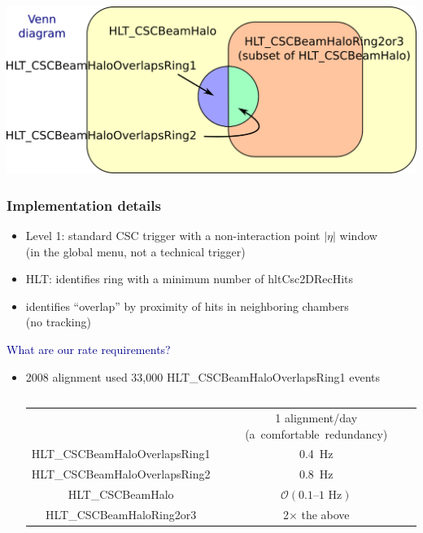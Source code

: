 \documentclass[compress]{beamer}
\begin{document}
\begin{frame}
\begin{center}
\includegraphics[width=0.85\linewidth]{venn_diagram.png}
\end{center}
\end{frame}

\begin{frame}
\frametitle{Implementation details}

\begin{itemize}
\item Level 1: standard CSC trigger with a non-interaction point $|\eta|$ \mbox{window\hspace{-1 cm}} \\ (in the global menu, not a technical trigger)

\item HLT: identifies ring with a minimum number of hltCsc2DRecHits

\item identifies ``overlap'' by proximity of hits in neighboring chambers \\ (no tracking)
\end{itemize}

\vfill
\hspace{-0.83 cm} \textcolor{darkblue}{\Large What are our rate requirements?}

\begin{itemize}
\item 2008 alignment used 33,000 {\scriptsize HLT\_CSCBeamHaloOverlapsRing1} events

\vspace{0.1 cm}
\begin{columns}

\renewcommand{\arraystretch}{1.2} \begin{tabular}{c c}
& 1 alignment/day \mbox{\scriptsize (a comfortable redundancy)\hspace{-3.5 cm}} \\
{\scriptsize HLT\_CSCBeamHaloOverlapsRing1} & 0.4~Hz \\
{\scriptsize HLT\_CSCBeamHaloOverlapsRing2} & 0.8~Hz \\
{\scriptsize HLT\_CSCBeamHalo} & $\mathcal{O}(\mbox{0.1--1~Hz})$ \\
{\scriptsize HLT\_CSCBeamHaloRing2or3} & 2$\times$ the above \\
\end{tabular}


\end{columns}
\end{itemize}
\end{frame}
\end{document}
